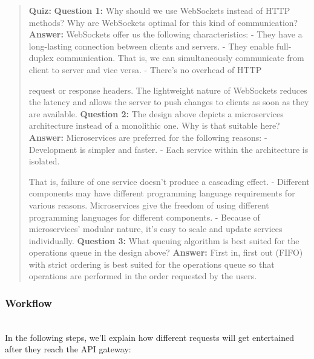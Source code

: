 \begin{quote}
\textbf{Quiz:}
\textbf{Question 1:} Why should we use WebSockets instead of HTTP methods? Why are WebSockets optimal for this kind of communication?
\textbf{Answer:} WebSockets offer us the following characteristics: - They have a long-lasting connection between clients and servers. - They enable full-duplex communication. That is, we can simultaneously communicate from client to server and vice versa. - There's no overhead of HTTP

request or response headers. The lightweight nature of WebSockets reduces the latency and allows the server to push changes to clients as soon as they are available.
\textbf{Question 2:} The design above depicts a microservices architecture instead of a monolithic one. Why is that suitable here?
\textbf{Answer:} Microservices are preferred for the following reasons: - Development is simpler and faster. - Each service within the architecture is isolated.

That is, failure of one service doesn't produce a cascading effect. - Different components may have different programming language requirements for various reasons. Microservices give the freedom of using different programming languages for different components. -
Because of microservices' modular nature, it's easy to scale and update services individually.
\textbf{Question 3:} What queuing algorithm is best suited for the operations queue in the design above?
\textbf{Answer:} First in, first out (FIFO) with strict ordering is best suited for the operations queue so that operations are performed in the order requested by the users.
\end{quote}

\subsubsection{Workflow}\label{Ng6G1Mx4m-Ea1cQsmA7DP}
\\
In the following steps, we'll explain how different requests will get entertained after they reach the API gateway:

